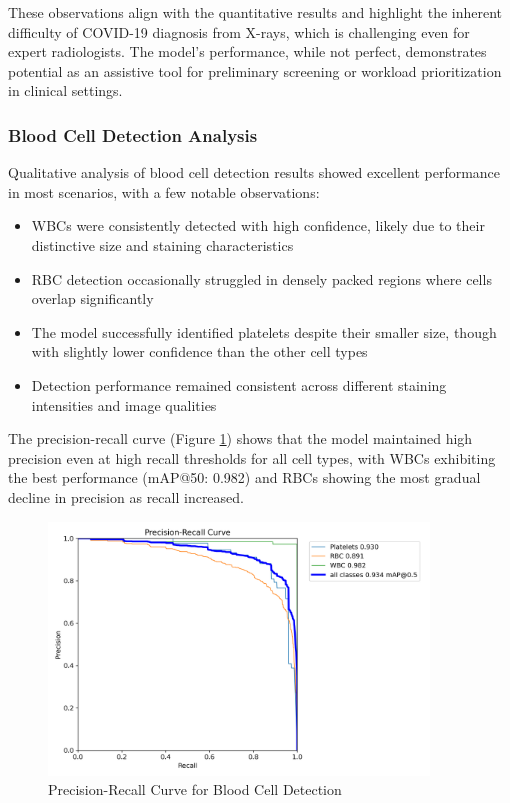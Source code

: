 \begin{multicols}{2}
These observations align with the quantitative results and highlight the inherent difficulty of COVID-19 diagnosis from X-rays, which is challenging even for expert radiologists. The model's performance, while not perfect, demonstrates potential as an assistive tool for preliminary screening or workload prioritization in clinical settings.

\subsubsection{Blood Cell Detection Analysis}

Qualitative analysis of blood cell detection results showed excellent performance in most scenarios, with a few notable observations:

\begin{itemize}
    \item WBCs were consistently detected with high confidence, likely due to their distinctive size and staining characteristics
    \item RBC detection occasionally struggled in densely packed regions where cells overlap significantly
    \item The model successfully identified platelets despite their smaller size, though with slightly lower confidence than the other cell types
    \item Detection performance remained consistent across different staining intensities and image qualities
\end{itemize}

The precision-recall curve (Figure \ref{fig:blood_cell_pr}) shows that the model maintained high precision even at high recall thresholds for all cell types, with WBCs exhibiting the best performance (mAP@50: 0.982) and RBCs showing the most gradual decline in precision as recall increased.
\end{multicols}

\begin{figure}[ht]
\centering
\includegraphics[width=0.9\textwidth]{datas/blood_cell_summary_datas/blood_cells_PR_curve.png}
\caption{Precision-Recall Curve for Blood Cell Detection}
\label{fig:blood_cell_pr}
\end{figure}

